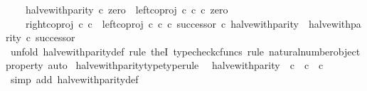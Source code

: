 \begin{isabellebody}
\ \ \ \ halve{\isacharunderscore}{\kern0pt}with{\isacharunderscore}{\kern0pt}parity\ {\isasymcirc}\isactrlsub c\ zero\ {\isacharequal}{\kern0pt}\ left{\isacharunderscore}{\kern0pt}coproj\ {\isasymnat}\isactrlsub c\ {\isasymnat}\isactrlsub c\ {\isasymcirc}\isactrlsub c\ zero\ {\isasymand}\isanewline
\ \ \ \ {\isacharparenleft}{\kern0pt}right{\isacharunderscore}{\kern0pt}coproj\ {\isasymnat}\isactrlsub c\ {\isasymnat}\isactrlsub c\ {\isasymamalg}\ {\isacharparenleft}{\kern0pt}left{\isacharunderscore}{\kern0pt}coproj\ {\isasymnat}\isactrlsub c\ {\isasymnat}\isactrlsub c\ {\isasymcirc}\isactrlsub c\ successor{\isacharparenright}{\kern0pt}{\isacharparenright}{\kern0pt}\ {\isasymcirc}\isactrlsub c\ halve{\isacharunderscore}{\kern0pt}with{\isacharunderscore}{\kern0pt}parity\ {\isacharequal}{\kern0pt}\ halve{\isacharunderscore}{\kern0pt}with{\isacharunderscore}{\kern0pt}parity\ {\isasymcirc}\isactrlsub c\ successor{\isachardoublequoteclose}\isanewline
%
\isadelimproof
\ \ %
\endisadelimproof
%
\isatagproof
{}\isamarkupfalse%
\ {\isacharparenleft}{\kern0pt}unfold\ halve{\isacharunderscore}{\kern0pt}with{\isacharunderscore}{\kern0pt}parity{\isacharunderscore}{\kern0pt}def{\isacharcomma}{\kern0pt}\ rule\ theI{\isacharprime}{\kern0pt}{\isacharcomma}{\kern0pt}\ typecheck{\isacharunderscore}{\kern0pt}cfuncs{\isacharcomma}{\kern0pt}\ rule\ natural{\isacharunderscore}{\kern0pt}number{\isacharunderscore}{\kern0pt}object{\isacharunderscore}{\kern0pt}property{}{\isacharcomma}{\kern0pt}\ auto{\isacharparenright}{\kern0pt}%
\endisatagproof
{\isafoldproof}%
%
\isadelimproof
\isanewline
%
\endisadelimproof
\isanewline
{}\isamarkupfalse%
\ halve{\isacharunderscore}{\kern0pt}with{\isacharunderscore}{\kern0pt}parity{\isacharunderscore}{\kern0pt}type{\isacharbrackleft}{\kern0pt}type{\isacharunderscore}{\kern0pt}rule{\isacharbrackright}{\kern0pt}{\isacharcolon}{\kern0pt}\isanewline
\ \ {\isachardoublequoteopen}halve{\isacharunderscore}{\kern0pt}with{\isacharunderscore}{\kern0pt}parity\ {\isacharcolon}{\kern0pt}\ {\isasymnat}\isactrlsub c\ {\isasymrightarrow}\ {\isasymnat}\isactrlsub c\ {\isasymCoprod}\ {\isasymnat}\isactrlsub c{\isachardoublequoteclose}\isanewline
%
\isadelimproof
\ \ %
\endisadelimproof
%
\isatagproof
{}\isamarkupfalse%
\ {\isacharparenleft}{\kern0pt}simp\ add{\isacharcolon}{\kern0pt}\ halve{\isacharunderscore}{\kern0pt}with{\isacharunderscore}{\kern0pt}parity{\isacharunderscore}{\kern0pt}def{}{\isacharparenright}{\kern0pt}%
\endisatagproof
{\isafoldproof}%
%
\isadelimproof
\isanewline
%
\endisadelimproof

\end{isabellebody}
